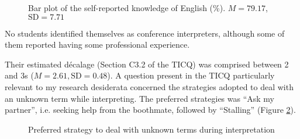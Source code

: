 \begin{figure}[H]
{}
\caption[Bar plot of the self-reported knowledge of English]{Bar plot of the self-reported knowledge of English (\%). $M=79.17$, $\text{SD}=7.71$}
\label{fig:EN_knowledge}
\end{figure}

 \label{experience_MS}
No students identified themselves as conference interpreters, although some of them reported having some professional experience.

Their estimated décalage (Section C3.2 of the TICQ) was comprised between 2 and 3s ($M=2.61, \text{SD}=0.48$). A question present in the TICQ particularly relevant to my research desiderata concerned the strategies adopted to deal with an unknown term while interpreting. The preferred strategies was ``Ask my partner'', i.e. seeking help from the boothmate, followed by ``Stalling'' (Figure \ref{fig:preferredstrategy}).

\begin{figure}
\caption[Preferred strategy for unknown terms during SI]{Preferred strategy to deal with unknown terms during interpretation}
\label{fig:preferredstrategy}
\end{figure}

